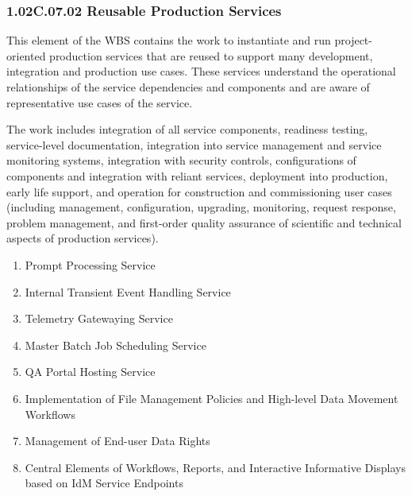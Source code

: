 \subsubsection{1.02C.07.02 Reusable Production Services}

This element of the WBS contains the work to instantiate and run project-oriented production services that are reused to support many development, integration and production use cases.
These services understand the operational relationships of the service dependencies and components and are aware of representative use cases of the service.

The work includes integration of all service components, readiness testing, service-level documentation, integration into service management and service monitoring systems, integration with security controls, configurations of components and integration with reliant services, deployment into production, early life support, and operation for construction and commissioning user cases (including management, configuration, upgrading, monitoring, request response, problem management, and first-order quality assurance of scientific and technical aspects of production services).

\begin{enumerate}

  \item{Prompt Processing Service}
  \item{Internal Transient Event Handling Service}
  \item{Telemetry Gatewaying Service}
  \item{Master Batch Job Scheduling Service}
  \item{QA Portal Hosting Service}
  \item{Implementation of File Management Policies and High-level Data Movement Workflows}
  \item{Management of End-user Data Rights}
  \item{Central Elements of Workflows, Reports, and Interactive Informative Displays based on IdM Service Endpoints}

\end{enumerate}

